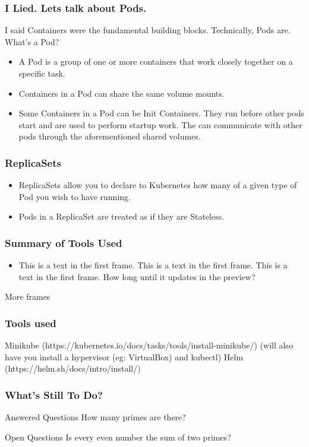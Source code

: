\documentclass{beamer}
\begin{document}
\begin{frame}
\frametitle{I Lied. Lets talk about Pods.}
I said Containers were the fundamental building blocks. Technically, Pods are. What's a Pod?
\begin{itemize}
    \item A Pod is a group of one or more containers that work closely together on a specific task.
    \item Containers in a Pod can share the same volume mounts.
    \item Some Containers in a Pod can be Init Containers. They run before other pods start and are used to perform startup work. The can communicate with other pods through the aforementioned shared volumes.
\end{itemize}
\end{frame}

\begin{frame}
\frametitle{ReplicaSets}
\begin{itemize}    
    \item ReplicaSets allow you to declare to Kubernetes how many of a given type of Pod you wish to have running.
    \item Pods in a ReplicaSet are treated as if they are Stateless.
\end{itemize}
\end{frame}


\begin{frame}
\frametitle{Summary of Tools Used}
\begin{itemize}
    \item This is a text in the first frame. This is a text in the first frame. This is a text in the first frame. How long until it updates in the preview?
\end{itemize}
\end{frame}

\begin{frame}
More frames
\end{frame}

\begin{frame}
\frametitle{Tools used}
Minikube (https://kubernetes.io/docs/tasks/tools/install-minikube/)
(will also have you install a hypervisor (eg: VirtualBox) and kubectl)
Helm (https://helm.sh/docs/intro/install/)
\end{frame}

\begin{frame}
\frametitle{What’s Still To Do?}
\begin{block}{Answered Questions}
    How many primes are there?
\end{block}
\begin{block}{Open Questions}
    Is every even number the sum of two primes?
\end{block}
\end{frame}
\end{document}

